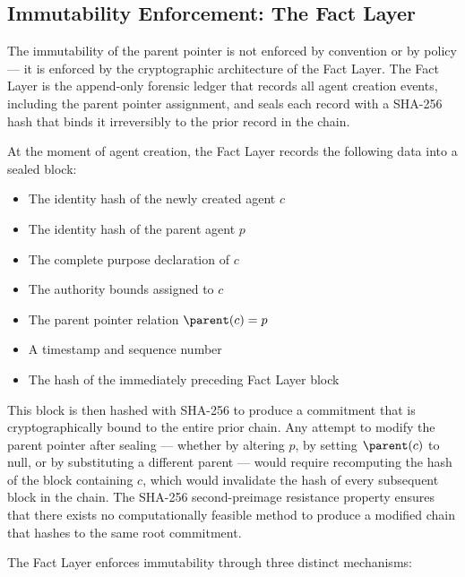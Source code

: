 \subsection{Immutability Enforcement: The Fact Layer}

The immutability of the parent pointer is not enforced by convention or by policy — it is enforced by the cryptographic architecture of the Fact Layer. The Fact Layer is the append-only forensic ledger that records all agent creation events, including the parent pointer assignment, and seals each record with a SHA-256 hash that binds it irreversibly to the prior record in the chain.

At the moment of agent creation, the Fact Layer records the following data into a sealed block:

\begin{itemize}
    \item The identity hash of the newly created agent $c$
    \item The identity hash of the parent agent $p$
    \item The complete purpose declaration of $c$
    \item The authority bounds assigned to $c$
    \item The parent pointer relation $\parent(c) = p$
    \item A timestamp and sequence number
    \item The hash of the immediately preceding Fact Layer block
\end{itemize}

This block is then hashed with SHA-256 to produce a commitment that is cryptographically bound to the entire prior chain. Any attempt to modify the parent pointer after sealing — whether by altering $p$, by setting $\parent(c)$ to null, or by substituting a different parent — would require recomputing the hash of the block containing $c$, which would invalidate the hash of every subsequent block in the chain. The SHA-256 second-preimage resistance property ensures that there exists no computationally feasible method to produce a modified chain that hashes to the same root commitment.

The Fact Layer enforces immutability through three distinct mechanisms:

